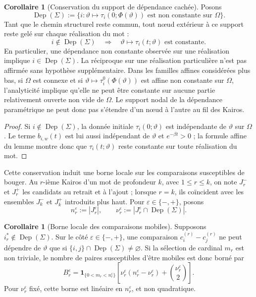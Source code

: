 \documentclass[11pt,a4paper]{article}
\theoremstyle{definition}
\newtheorem{corollary}[definition]{Corollaire}
\theoremstyle{remark}
\begin{document}
\begin{corollary}[Conservation du support de dépendance cachée]
Posons
\[
 \operatorname{Dep}(\Sigma):=\{i:\vartheta\mapsto\tau_i(0;\Phi(\vartheta))\text{ est non constante sur }\Omega\}.
\]
Tant que le chemin structurel reste commun, tout nœud extérieur à ce support reste gelé sur chaque réalisation du mot :
\[
 i\notin\operatorname{Dep}(\Sigma)
 \quad\Longrightarrow\quad
 \vartheta\mapsto\tau_i(t;\vartheta)\text{ est constante}.
\]
En particulier, une dépendance non constante observée sur une réalisation implique $i\in\operatorname{Dep}(\Sigma)$. La réciproque sur une réalisation particulière n'est pas affirmée sans hypothèse supplémentaire. Dans les familles affines considérées plus bas, si $\Omega$ est connexe et si $\vartheta\mapsto\tau_i^0(\Phi(\vartheta))$ est affine non constante sur $\Omega$, l'analyticité implique qu'elle ne peut être constante sur aucune partie relativement ouverte non vide de $\Omega$. Le support nodal de la dépendance paramétrique ne peut donc pas s'étendre d'un nœud à l'autre au fil des Kairos.
\end{corollary}

\begin{proof}
Si $i\notin\operatorname{Dep}(\Sigma)$, la donnée initiale $\tau_i(0;\vartheta)$ est indépendante de $\vartheta$ sur $\Omega$. Le terme $b_{i,w}(t)$ est lui aussi indépendant de $\vartheta$ et $e^{-\beta t}>0$ ; la formule affine du lemme montre donc que $\tau_i(t;\vartheta)$ reste constante sur toute réalisation du mot.
\end{proof}

Cette conservation induit une borne locale sur les comparaisons susceptibles de bouger. Au $r$-ième Kairos d'un mot de profondeur $k$, avec $1\le r\le k$, on note $J_r^-$ et $J_r^+$ les candidats au retrait et à l'ajout ; lorsque $r=k$, ils coïncident avec les ensembles $J_k^-$ et $J_k^+$ introduits plus haut. Pour $\varepsilon\in\{-,+\}$, posons
\[
 n_r^\varepsilon:=|J_r^\varepsilon|,
 \qquad
 \nu_r^\varepsilon:=|J_r^\varepsilon\cap\operatorname{Dep}(\Sigma)|.
\]

\begin{corollary}[Borne locale des comparaisons mobiles]
\label{cor:borne-paires-mobiles}
Supposons $i_r^*\notin\operatorname{Dep}(\Sigma)$. Sur le côté $\varepsilon\in\{-,+\}$, une comparaison $c_i^{(r)}-c_j^{(r)}$ ne peut dépendre de $\vartheta$ que si $\{i,j\}\cap\operatorname{Dep}(\Sigma)\neq\varnothing$. Si la sélection de cardinal $m_r$ est non triviale, le nombre de paires susceptibles d'être mobiles est donc borné par
\[
 \boxed{
 B_r^\varepsilon
 =\mathbf 1_{\{0<m_r<n_r^\varepsilon\}}
 \left[
 \nu_r^\varepsilon(n_r^\varepsilon-\nu_r^\varepsilon)
 +\binom{\nu_r^\varepsilon}{2}
 \right].}
\]
Pour $\nu_r^\varepsilon$ fixé, cette borne est linéaire en $n_r^\varepsilon$, et non quadratique.
\end{corollary}
\end{document}
